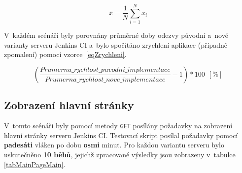             \begin{equation}\label{eqPrumer}
                \overline{x} = \frac{1}{N}\sum_{i=1}^Nx_i
            \end{equation}
            \medskip

            V~každém scénáři byly porovnány průměrné doby odezvy původní a~nové
            varianty serveru Jenkins CI a~bylo spočítáno zrychlení aplikace (případně zpomalení) pomocí vzorce~\ref{eqZrychleni}.

            \begin{equation}\label{eqZrychleni}
                \left(\frac{Prumerna\_rychlost\_puvodni\_implementace}{Prumerna\_rychlost\_nove\_implementace} - 1\right)* 100 ~~ [\%]
            \end{equation}
            \medskip


        \subsection{Zobrazení hlavní stránky}
            V~tomto scénáři byly pomocí metody \texttt{GET} posílány požadavky na zobrazení hlavní 
            stránky serveru Jenkins CI. Testovací skript posílal požadavky pomocí \textbf{padesáti} vláken po dobu \textbf{osmi} minut.
            Pro každou variantu serveru bylo uskutečněno \textbf{10 běhů}, 
            jejichž zpracované výsledky jsou zobrazeny v~tabulce \ref{tabMainPageMain}.

